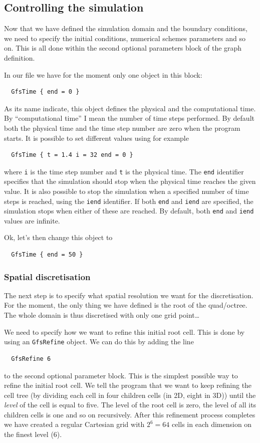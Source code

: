 \documentclass[a4paper]{article}
\begin{document}
\subsection{Controlling the simulation}

Now that we have defined the simulation domain and the boundary
conditions, we need to specify the initial conditions, numerical
schemes parameters and so on. This is all done within the second
optional parameters block of the graph definition.

In our file we have for the moment only one object in this block:
\begin{verbatim}
  GfsTime { end = 0 }
\end{verbatim}
As its name indicate, this object defines the physical and the
computational time. By ``computational time'' I mean the number of
time steps performed. By default both the physical time and the time
step number are zero when the program starts. It is possible to set
different values using for example
\begin{verbatim}
  GfsTime { t = 1.4 i = 32 end = 0 }
\end{verbatim}
where {\tt i} is the time step number and {\tt t} is the physical
time. The {\tt end} identifier specifies that the simulation should
stop when the physical time reaches the given value. It is also
possible to stop the simulation when a specified number of time steps
is reached, using the {\tt iend} identifier. If both {\tt end} and
{\tt iend} are specified, the simulation stops when either of these
are reached. By default, both {\tt end} and {\tt iend} values are
infinite.

Ok, let's then change this object to
\begin{verbatim}
  GfsTime { end = 50 }
\end{verbatim}

\subsubsection{Spatial discretisation}

The next step is to specify what spatial resolution we want for the
discretisation. For the moment, the only thing we have defined is the
root of the quad/octree. The whole domain is thus discretised with
only one grid point\dots

We need to specify how we want to refine this initial root cell. This
is done by using an {\tt GfsRefine} object. We can do this by adding
the line
\begin{verbatim}
  GfsRefine 6
\end{verbatim}
to the second optional parameter block. This is the simplest possible
way to refine the initial root cell. We tell the program that we want
to keep refining the cell tree (by dividing each cell in four children
cells (in 2D, eight in 3D)) until the {\em level} of the cell is equal
to five. The level of the root cell is zero, the level of all its
children cells is one and so on recursively. After this refinement
process completes we have created a regular Cartesian grid with
$2^6=64$ cells in each dimension on the finest level ($6$).
\end{document}
